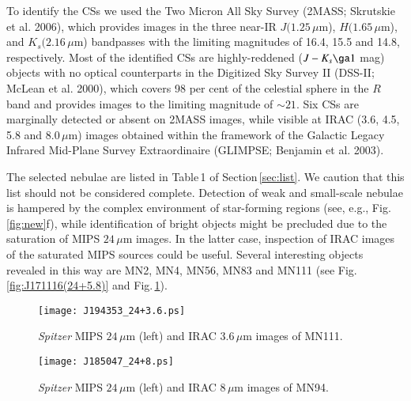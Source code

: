 \documentclass[useAMS]{mn2e}
\begin{document}
To identify the CSs we used the Two Micron All Sky Survey (2MASS;
Skrutskie et al. 2006), which provides images in the three near-IR
$J(1.25 \, \mu$m), $H(1.65 \, \mu$m), and $K_s(2.16 \, \mu$m)
bandpasses with the limiting magnitudes of 16.4, 15.5 and 14.8,
respectively. Most of the identified CSs are highly-reddened ($J-K_s
\ga 1$ mag) objects with no optical counterparts in the Digitized
Sky Survey II (DSS-II; McLean et al. 2000), which covers 98 per cent
of the celestial sphere in the $R$ band and provides images to the
limiting magnitude of $\sim 21$. Six CSs are marginally detected or
absent on 2MASS images, while visible at IRAC (3.6, 4.5, 5.8 and
$8.0 \, \mu$m) images obtained within the framework of the Galactic
Legacy Infrared Mid-Plane Survey Extraordinaire (GLIMPSE; Benjamin
et al. 2003).

The selected nebulae are listed in Table\,1 of
Section\,\ref{sec:list}. We caution that this list should not be
considered complete. Detection of weak and small-scale nebulae is
hampered by the complex environment of star-forming regions (see,
e.g., Fig.\,\ref{fig:new}f), while identification of bright objects
might be precluded due to the saturation of MIPS $24\, \mu$m images.
In the latter case, inspection of IRAC images of the saturated MIPS
sources could be useful. Several interesting objects revealed in
this way are MN2, MN4, MN56, MN83 and MN111 (see
Fig.\,\ref{fig:J171116(24+5.8)} and
Fig.\,\ref{fig:J194353(24+3.6)}).
%
\begin{figure}
\begin{center}
\texttt{[image: J194353\_24+3.6.ps]}
\end{center}
\caption{{\it Spitzer} MIPS $24 \, \mu$m (left) and IRAC $3.6 \, \mu$m images of MN111.}
\label{fig:J194353(24+3.6)}
\end{figure}
%
%
\begin{figure}
\begin{center}
\texttt{[image: J185047\_24+8.ps]}
\end{center}
\caption{{\it Spitzer} MIPS $24 \, \mu$m (left) and IRAC $8 \, \mu$m images of MN94.}
\label{fig:J185047(24+8)}
\end{figure}
%
\end{document}
